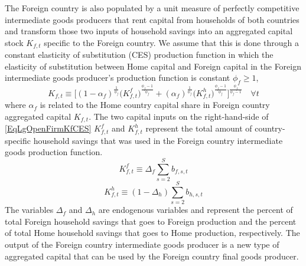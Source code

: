 \documentclass[letterpaper,12pt]{article}
\theoremstyle{definition}
\begin{document}
    The Foreign country is also populated by a unit measure of perfectly competitive intermediate goods producers that rent capital from households of both countries and transform those two inputs of household savings into an aggregated capital stock $K_{f,t}$ specific to the Foreign country. We assume that this is done through a constant elasticity of substitution (CES) production function in which the elasticity of substitution between Home capital and Foreign capital in the Foreign intermediate goods producer's production function is constant $\phi_f\geq 1$,
    \begin{equation}\label{EqLgOpenFirmKfCES}
      K_{f,t}\equiv \biggl[(1 - \alpha_f)^\frac{1}{\phi_f}\bigl(K^f_{f,t}\bigr)^\frac{\phi_f-1}{\phi_f} + (\alpha_f)^\frac{1}{\phi_f}\bigl(K^h_{f,t}\bigr)^\frac{\phi_f-1}{\phi_f}\biggr]^\frac{\phi_f}{\phi_f-1} \quad\forall t
    \end{equation}
    where $\alpha_f$ is related to the Home country capital share in Foreign country aggregated capital $K_{f,t}$. The two capital inputs on the right-hand-side of \eqref{EqLgOpenFirmKfCES} $K^f_{f,t}$ and $K^h_{f,t}$ represent the total amount of country-specific household savings that was used in the Foreign country intermediate goods production function.
    \begin{equation}\label{EqLgOpenFirmKff}
      K^f_{f,t} \equiv \Delta_f \sum_{s=2}^S b_{f,s,t}
    \end{equation}
    \begin{equation}\label{EqLgOpenFirmKfh}
      K^h_{f,t} \equiv (1 - \Delta_h)\sum_{s=2}^S b_{h,s,t}
    \end{equation}
    The variables $\Delta_f$ and $\Delta_h$ are endogenous variables and represent the percent of total Foreign household savings that goes to Foreign production and the percent of total Home household savings that goes to Home production, respectively. The output of the Foreign country intermediate goods producer is a new type of aggregated capital that can be used by the Foreign country final goods producer.
\end{document}
